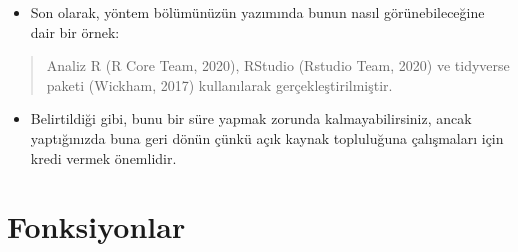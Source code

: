 \documentclass[
  oneside]{book}
\providecommand{\tightlist}{%
  \setlength{\itemsep}{0pt}\setlength{\parskip}{0pt}}
\begin{document}
\begin{itemize}
\tightlist
\item
  Son olarak, yöntem bölümünüzün yazımında bunun nasıl görünebileceğine dair bir örnek:
\end{itemize}

\begin{quote}
Analiz R (R Core Team, 2020), RStudio (Rstudio Team, 2020) ve tidyverse paketi (Wickham, 2017) kullanılarak gerçekleştirilmiştir.
\end{quote}

\begin{itemize}
\tightlist
\item
  Belirtildiği gibi, bunu bir süre yapmak zorunda kalmayabilirsiniz, ancak yaptığınızda buna geri dönün çünkü açık kaynak topluluğuna çalışmaları için kredi vermek önemlidir.
\end{itemize}

\hypertarget{fonksiyonlar}{%
\chapter{Fonksiyonlar}\label{fonksiyonlar}}
\end{document}

